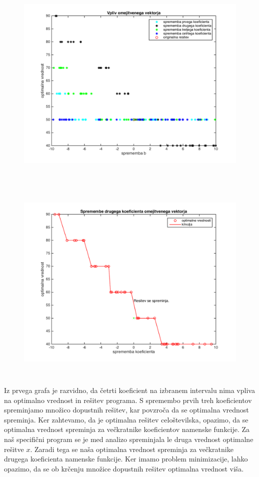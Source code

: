 \documentclass[a4paper,12pt]{article}
\begin{document}
\begin{figure}[h]
\includegraphics[width=14cm,height=10cm]{spremembe_b.png}
\end{figure}
\begin{figure}[h]
\includegraphics[width=14cm,height=10cm]{spremembe_b2.png}
\end{figure}

Iz prvega grafa je razvidno, da četrti koeficient na izbranem intervalu nima vpliva na optimalno vrednost in rešitev programa. S spremembo prvih treh koeficientov spreminjamo množico dopustnih rešitev, kar povzroča da se optimalna vrednost spreminja. Ker zahtevamo, da je optimalna rešitev celoštevilska, opazimo, da se optimalna vrednost spreminja za večkratnike koeficientov namenske funkcije. Za naš specifični program se je med analizo spreminjala le druga vrednost optimalne rešitve $x$. Zaradi tega se naša optimalna vrednost spreminja za večkratnike drugega koeficienta namenske funkcije. 
Ker imamo problem minimizacije, lahko opazimo, da se ob krčenju množice dopustnih rešitev optimalna vrednost viša. 
\end{document}
